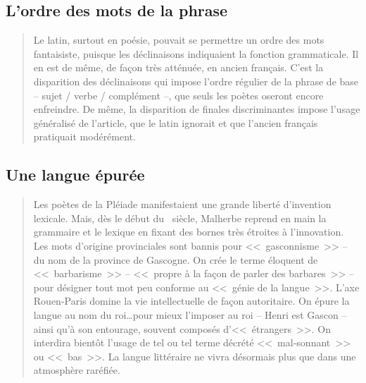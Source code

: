 \subsection{L'ordre des mots de la phrase}\label{subsec:ordmot}

\begin{quotation}
  Le latin, surtout en poésie, pouvait se permettre un ordre des mots
  fantaisiste, puisque les déclinaisons indiquaient la fonction
  grammaticale. Il en est de même, de façon très atténuée, en ancien
  français. C'est la disparition des déclinaisons qui impose l'ordre
  régulier de la phrase de base -- sujet / verbe / complément --, que
  seuls les poètes oseront encore enfreindre. De même, la disparition
  de finales discriminantes impose l'usage généralisé de l'article,
  que le latin ignorait et que l'ancien français pratiquait modérément.
\end{quotation}

\subsection{Une langue épurée}\label{langpur}

\begin{quotation}
  Les poètes de la Pléiade manifestaient une grande liberté
  d'invention lexicale.
  Mais, dès le début du \textsc{}~siècle,
  Malherbe reprend en main la grammaire et le lexique en fixant des
  bornes très étroites à l'innovation.
  Les mots d'origine provinciales sont bannis pour <<~gasconnisme~>>
  -- du nom de la province de Gascogne. On crée le terme éloquent de
  <<~barbarisme~>> -- <<~propre à la façon de parler des barbares~>>
  -- pour désigner tout mot peu conforme au <<~génie de la
  langue~>>. L'axe Rouen-Paris domine la vie intellectuelle de façon
  autoritaire. On épure la langue au nom du roi\dots pour mieux
  l'imposer au roi -- Henri \textsc{} est Gascon --
  ainsi qu'à son entourage, souvent composés d'<<~étrangers~>>. On
  interdira bientôt l'usage de tel ou tel terme décrété
  <<~mal-sonnant~>> ou <<~bas~>>. La langue littéraire ne vivra
  désormais plus que dans une atmosphère raréfiée.
\end{quotation}